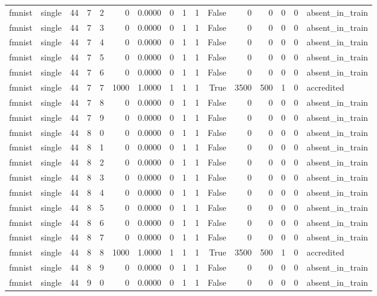 \begin{tabular}{llrrrrrrrrrrrrrl}
fmnist & single & 44 & 7 & 2 & 0 & 0.0000 & 0 & 1 & 1 & False & 0 & 0 & 0 & 0 & absent\_in\_train \\
fmnist & single & 44 & 7 & 3 & 0 & 0.0000 & 0 & 1 & 1 & False & 0 & 0 & 0 & 0 & absent\_in\_train \\
fmnist & single & 44 & 7 & 4 & 0 & 0.0000 & 0 & 1 & 1 & False & 0 & 0 & 0 & 0 & absent\_in\_train \\
fmnist & single & 44 & 7 & 5 & 0 & 0.0000 & 0 & 1 & 1 & False & 0 & 0 & 0 & 0 & absent\_in\_train \\
fmnist & single & 44 & 7 & 6 & 0 & 0.0000 & 0 & 1 & 1 & False & 0 & 0 & 0 & 0 & absent\_in\_train \\
fmnist & single & 44 & 7 & 7 & 1000 & 1.0000 & 1 & 1 & 1 & True & 3500 & 500 & 1 & 0 & accredited \\
fmnist & single & 44 & 7 & 8 & 0 & 0.0000 & 0 & 1 & 1 & False & 0 & 0 & 0 & 0 & absent\_in\_train \\
fmnist & single & 44 & 7 & 9 & 0 & 0.0000 & 0 & 1 & 1 & False & 0 & 0 & 0 & 0 & absent\_in\_train \\
fmnist & single & 44 & 8 & 0 & 0 & 0.0000 & 0 & 1 & 1 & False & 0 & 0 & 0 & 0 & absent\_in\_train \\
fmnist & single & 44 & 8 & 1 & 0 & 0.0000 & 0 & 1 & 1 & False & 0 & 0 & 0 & 0 & absent\_in\_train \\
fmnist & single & 44 & 8 & 2 & 0 & 0.0000 & 0 & 1 & 1 & False & 0 & 0 & 0 & 0 & absent\_in\_train \\
fmnist & single & 44 & 8 & 3 & 0 & 0.0000 & 0 & 1 & 1 & False & 0 & 0 & 0 & 0 & absent\_in\_train \\
fmnist & single & 44 & 8 & 4 & 0 & 0.0000 & 0 & 1 & 1 & False & 0 & 0 & 0 & 0 & absent\_in\_train \\
fmnist & single & 44 & 8 & 5 & 0 & 0.0000 & 0 & 1 & 1 & False & 0 & 0 & 0 & 0 & absent\_in\_train \\
fmnist & single & 44 & 8 & 6 & 0 & 0.0000 & 0 & 1 & 1 & False & 0 & 0 & 0 & 0 & absent\_in\_train \\
fmnist & single & 44 & 8 & 7 & 0 & 0.0000 & 0 & 1 & 1 & False & 0 & 0 & 0 & 0 & absent\_in\_train \\
fmnist & single & 44 & 8 & 8 & 1000 & 1.0000 & 1 & 1 & 1 & True & 3500 & 500 & 1 & 0 & accredited \\
fmnist & single & 44 & 8 & 9 & 0 & 0.0000 & 0 & 1 & 1 & False & 0 & 0 & 0 & 0 & absent\_in\_train \\
fmnist & single & 44 & 9 & 0 & 0 & 0.0000 & 0 & 1 & 1 & False & 0 & 0 & 0 & 0 & absent\_in\_train \\

\end{tabular}
